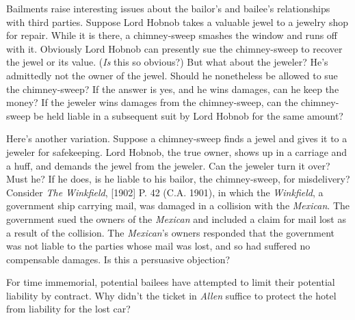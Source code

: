 
\item Bailments raise interesting issues about the bailor's and bailee's
relationships with third parties. Suppose Lord Hobnob takes a valuable jewel to
a jewelry shop for repair. While it is there, a chimney-sweep smashes the
window and runs off with it. Obviously Lord Hobnob can presently sue the
chimney-sweep to recover the jewel or its value. (\textit{Is} this so obvious?)
But what about the jeweler? He's admittedly not the owner of the jewel. Should
he nonetheless be allowed to sue the chimney-sweep? If the answer is yes, and
he wins damages, can he keep the money? If the jeweler wins damages from the
chimney-sweep, can the chimney-sweep be held liable in a subsequent suit by
Lord Hobnob for the same amount?


\item Here's another variation. Suppose a chimney-sweep finds a jewel and gives
it to a jeweler for safekeeping. Lord Hobnob, the true owner, shows up in a
carriage and a huff, and demands the jewel from the jeweler. Can the jeweler
turn it over? Must he? If he does, is he liable to his bailor, the
chimney-sweep, for misdelivery? Consider \textit{The Winkfield}, [1902] P. 42
(C.A. 1901), in which the \textit{Winkfield}, a government ship carrying mail,
was damaged in a collision with the \textit{Mexican}. The government sued the
owners of the \textit{Mexican} and included a claim for mail lost as a result
of the collision. The \textit{Mexican}{}'s owners responded that the government
was not liable to the parties whose mail was lost, and so had suffered no
compensable damages. Is this a persuasive objection?


\item For time immemorial, potential bailees have attempted to limit their
potential liability by contract. Why didn't the ticket in \textit{Allen}
suffice to protect the hotel from liability for the lost car? 


